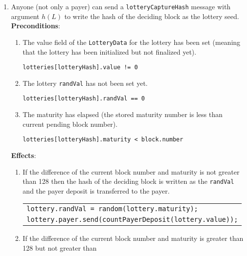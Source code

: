 \documentclass[a4paper]{article}
\begin{document}
\begin{enumerate}
        \item Anyone (not only a payer) can send a \texttt{lotteryCaptureHash} message with argument $h(L)$ to write
            the hash of the deciding block as the lottery seed.\\
            \textbf{Preconditions}:
            \begin{enumerate}
                \item The value field of the \texttt{LotteryData} for the lottery has been set (meaning that the
                lottery has been initialized but not finalized yet).
                    \begin{center}
	                    \texttt{lotteries[lotteryHash].value != 0}
                    \end{center}
                \item The lottery \texttt{randVal} has not been set yet.
                    \begin{center}
	                    \texttt{lotteries[lotteryHash].randVal == 0}
	                \end{center}
                \item The maturity has elapsed (the stored maturity number is less than current pending block number).
                    \begin{center}
                	    \texttt{lotteries[lotteryHash].maturity < block.number}
                	\end{center}
	        \end{enumerate}
        \textbf{Effects}:
        \begin{enumerate}
            \item  If the difference of the current block number and maturity is not greater than 128 then the hash of
                the deciding block is written as the \texttt{randVal} and the payer deposit is transferred to the payer.
                \begin{center}
                    \begin{tabular}{l}
                        \texttt{lottery.randVal = random(lottery.maturity);}\\
                        \texttt{lottery.payer.send(countPayerDeposit(lottery.value));}
                    \end{tabular}
                \end{center}
            \item If the difference of the current block number and maturity is greater than 128 but not greater than

\end{enumerate}
\end{enumerate}
\end{document}
